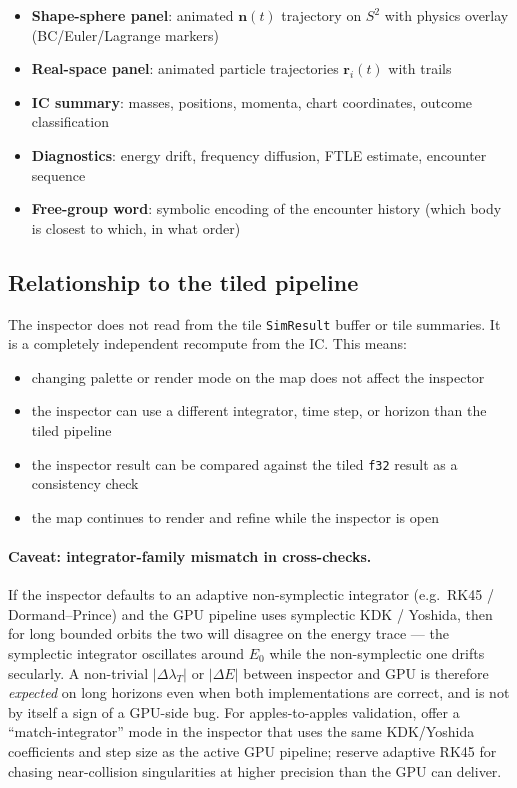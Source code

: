 \documentclass[11pt]{report}
\begin{document}
\begin{itemize}[nosep]
\item \textbf{Shape-sphere panel}: animated $\mathbf n(t)$ trajectory on $S^2$ with physics overlay (BC/Euler/Lagrange markers)
\item \textbf{Real-space panel}: animated particle trajectories $\mathbf r_i(t)$ with trails
\item \textbf{IC summary}: masses, positions, momenta, chart coordinates, outcome classification
\item \textbf{Diagnostics}: energy drift, frequency diffusion, FTLE estimate, encounter sequence
\item \textbf{Free-group word}: symbolic encoding of the encounter history (which body is closest to which, in what order)
\end{itemize}

\subsection{Relationship to the tiled pipeline}

The inspector does not read from the tile \texttt{SimResult} buffer or tile summaries. It is a completely independent recompute from the IC. This means:

\begin{itemize}[nosep]
\item changing palette or render mode on the map does not affect the inspector
\item the inspector can use a different integrator, time step, or horizon than the tiled pipeline
\item the inspector result can be compared against the tiled \texttt{f32} result as a consistency check
\item the map continues to render and refine while the inspector is open
\end{itemize}

\paragraph{Caveat: integrator-family mismatch in cross-checks.} If the inspector defaults to an adaptive non-symplectic integrator (e.g.\ RK45 / Dormand--Prince) and the GPU pipeline uses symplectic KDK / Yoshida, then for long bounded orbits the two will disagree on the energy trace --- the symplectic integrator oscillates around $E_0$ while the non-symplectic one drifts secularly. A non-trivial $|\Delta\lambda_T|$ or $|\Delta E|$ between inspector and GPU is therefore \emph{expected} on long horizons even when both implementations are correct, and is not by itself a sign of a GPU-side bug. For apples-to-apples validation, offer a ``match-integrator'' mode in the inspector that uses the same KDK/Yoshida coefficients and step size as the active GPU pipeline; reserve adaptive RK45 for chasing near-collision singularities at higher precision than the GPU can deliver.
\end{document}
